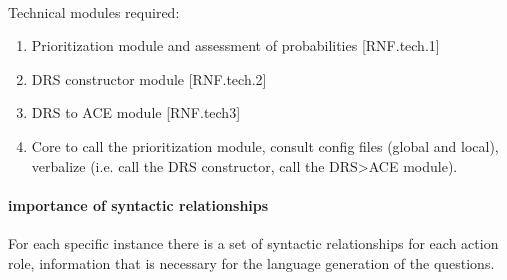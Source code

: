 \documentclass[10pt,a4paper]{article}
\begin{document}
\begin{center} %
\\
\vspace{1 mm}
\end{center}

Technical modules required: 
\begin{enumerate}
 \item Prioritization module and assessment of probabilities [RNF.tech.1]
 \item DRS constructor module [RNF.tech.2]
 \item DRS to ACE module [RNF.tech3]
 \item Core to call the prioritization module, consult config files (global and local), 
 verbalize (i.e. call the DRS constructor, call the DRS>ACE module).
\end{enumerate}


\paragraph{importance of syntactic relationships}
For each specific instance there is a set of syntactic relationships for each 
action role, information that is necessary for the language generation of 
the questions.
\end{document}
